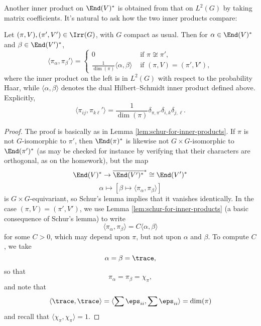 \documentclass[reqno]{amsart} 
\begin{document}
Another inner product on $\End(V)^*$ is obtained from that on $L^2(G)$ by taking matrix coefficients.  It's natural to ask how the two inner products compare:
\begin{theorem}
  Let $(\pi,V), (\pi ',V') \in \Irr(G)$, with $G$ compact as usual.  Then for $\alpha \in \End(V)^*$ and $\beta \in \End(V')^*$,
  \begin{equation*}
    \langle
    \pi_{\alpha}, \pi_{\beta }'
    \rangle
    = 
    \begin{cases}
      0 &  \text{ if } \pi \not\cong \pi ', \\
      \frac{1}{\dim(\pi)} \langle \alpha, \beta  \rangle
        & \text{ if } (\pi,V) = (\pi ', V'),
    \end{cases}
  \end{equation*}
  where the inner product on the left is in $L^2(G)$ with respect to the probability Haar, while $\langle \alpha, \beta \rangle$ denotes the dual Hilbert--Schmidt inner product defined above.  Explicitly,
  \begin{equation}
    \langle \pi_{i j}, \pi_{k \ell}' \rangle
    = \frac{1}{\dim(\pi)}
    \delta_{\pi, \pi'}
    \delta_{i, k} \delta_{j, \ell}.
  \end{equation}
\end{theorem}
\begin{proof}
  The proof is basically as in Lemma \ref{lem:schur-for-inner-products}.  If $\pi$ is not $G$-isomorphic to $\pi '$, then $\End(\pi)^*$ is likewise not $G \times G$-isomorphic to $\End(\pi ')^*$ (as may be checked for instance by verifying that their characters are orthogonal, as on the homework), but the map
  \begin{equation*}
    \End(V)^* \rightarrow \overline{\End(V')^*}^* \cong \End(V')^*
  \end{equation*}
  \begin{equation*}
    \alpha \mapsto [\beta \mapsto \langle \pi_\alpha, \pi_\beta \rangle]
  \end{equation*}
  is $G \times G$-equivariant, so Schur's lemma implies that it vanishes identically.  In the case $(\pi, V) = (\pi ', V')$, we use Lemma \ref{lem:schur-for-inner-products} (a basic consequence of Schur's lemma) to write
  \begin{equation*}
    \langle \pi_\alpha, \pi _\beta \rangle = C \langle \alpha, \beta \rangle
  \end{equation*}
  for some $C > 0$, which may depend upon $\pi$, but not upon $\alpha$ and $\beta$.  To compute $C$, we take
  \begin{equation*}
    \alpha = \beta = \trace,
  \end{equation*}
  so that
  \begin{equation*}
    \pi_\alpha = \pi_\beta = \chi_\pi,
  \end{equation*}
  and note that
  \begin{equation*}
    \langle \trace, \trace \rangle = \langle \sum \eps_{i i}, \sum \eps_{i i} \rangle = \dim(\pi)
  \end{equation*}
  and recall that $\langle \chi_\pi, \chi_\pi \rangle = 1$.
\end{proof}
\end{document}
